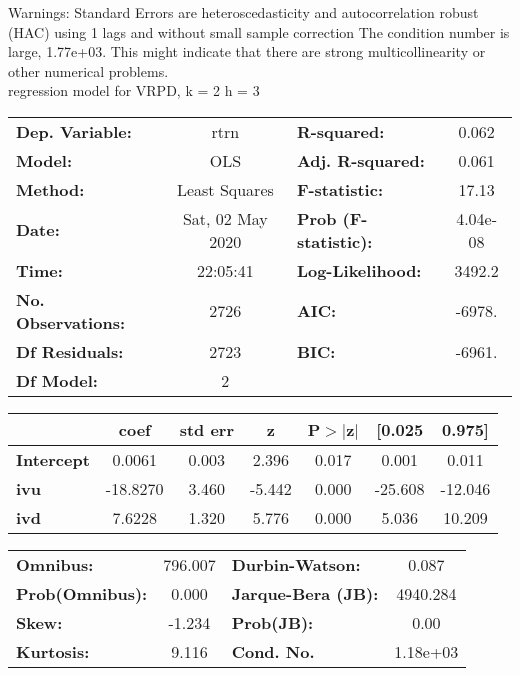 Warnings: \newline
 [1] Standard Errors are heteroscedasticity and autocorrelation robust (HAC) using 1 lags and without small sample correction \newline
 [2] The condition number is large, 1.77e+03. This might indicate that there are \newline
 strong multicollinearity or other numerical problems.\\ 

regression model for VRPD, k = 2 h = 3\begin{center}
\begin{tabular}{lclc}
\toprule
\textbf{Dep. Variable:}    &       rtrn       & \textbf{  R-squared:         } &     0.062   \\
\textbf{Model:}            &       OLS        & \textbf{  Adj. R-squared:    } &     0.061   \\
\textbf{Method:}           &  Least Squares   & \textbf{  F-statistic:       } &     17.13   \\
\textbf{Date:}             & Sat, 02 May 2020 & \textbf{  Prob (F-statistic):} &  4.04e-08   \\
\textbf{Time:}             &     22:05:41     & \textbf{  Log-Likelihood:    } &    3492.2   \\
\textbf{No. Observations:} &        2726      & \textbf{  AIC:               } &    -6978.   \\
\textbf{Df Residuals:}     &        2723      & \textbf{  BIC:               } &    -6961.   \\
\textbf{Df Model:}         &           2      & \textbf{                     } &             \\
\bottomrule
\end{tabular}
\begin{tabular}{lcccccc}
                   & \textbf{coef} & \textbf{std err} & \textbf{z} & \textbf{P$> |$z$|$} & \textbf{[0.025} & \textbf{0.975]}  \\
\midrule
\textbf{Intercept} &       0.0061  &        0.003     &     2.396  &         0.017        &        0.001    &        0.011     \\
\textbf{ivu}       &     -18.8270  &        3.460     &    -5.442  &         0.000        &      -25.608    &      -12.046     \\
\textbf{ivd}       &       7.6228  &        1.320     &     5.776  &         0.000        &        5.036    &       10.209     \\
\bottomrule
\end{tabular}
\begin{tabular}{lclc}
\textbf{Omnibus:}       & 796.007 & \textbf{  Durbin-Watson:     } &    0.087  \\
\textbf{Prob(Omnibus):} &   0.000 & \textbf{  Jarque-Bera (JB):  } & 4940.284  \\
\textbf{Skew:}          &  -1.234 & \textbf{  Prob(JB):          } &     0.00  \\
\textbf{Kurtosis:}      &   9.116 & \textbf{  Cond. No.          } & 1.18e+03  \\
\bottomrule
\end{tabular}
\end{center}

